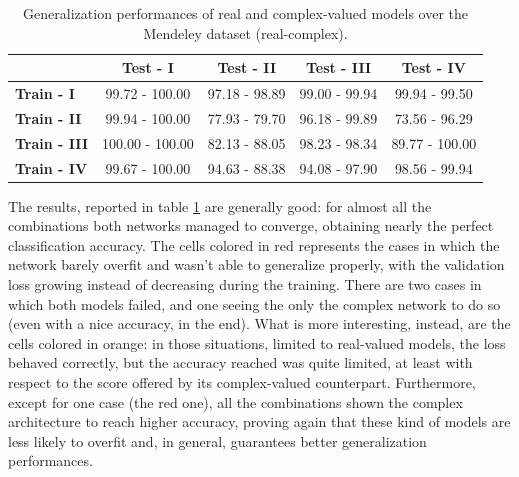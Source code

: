 \documentclass[../main.tex]{subfiles}
\begin{document}
\begin{table}[ht]
	\centering
	\begin{tabular}{l|c|c|c|c}
		 & \textbf{Test - I} & \textbf{Test - II} & \textbf{Test - III} & \textbf{Test - IV} \\
		\toprule
		\textbf{Train - I} & 99.72 - 100.00 & 97.18 - 98.89 & 99.00 - 99.94 & 99.94 - 99.50\\
		\midrule
		\textbf{Train - II} & 99.94 - 100.00 & \cellcolor{red} 77.93 - 79.70 & 96.18 - 99.89 & \cellcolor{orange} 73.56 - 96.29\\
		\midrule
		\textbf{Train - III} & 100.00 - 100.00 & \cellcolor{red} 82.13 - 88.05 & 98.23 - 98.34 & \cellcolor{orange} 89.77 - 100.00\\
		\midrule
		\textbf{Train - IV} & 99.67 - 100.00 & \cellcolor{red} 94.63 - 88.38 & 94.08 - 97.90 & 98.56 - 99.94\\
		\bottomrule
	\end{tabular}
	\caption{Generalization performances of real and complex-valued models over the Mendeley dataset (real-complex).}
	\label{tab:mendeley_generalization}
\end{table}
The results, reported in table \ref{tab:mendeley_generalization} are generally good: for almost all the combinations both networks managed to converge, obtaining nearly the perfect classification accuracy. The cells colored in red represents the cases in which the network barely overfit and wasn't able to generalize properly, with the validation loss growing instead of decreasing during the training. There are two cases in which both models failed, and one seeing the only the complex network to do so (even with a nice accuracy, in the end). What is more interesting, instead, are the cells colored in orange: in those situations, limited to real-valued models, the loss behaved correctly, but the accuracy reached was quite limited, at least with respect to the score offered by its complex-valued counterpart. Furthermore, except for one case (the red one), all the combinations shown the complex architecture to reach higher accuracy, proving again that these kind of models are less likely to overfit and, in general, guarantees better generalization performances.




	
\end{document}
